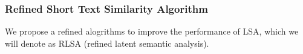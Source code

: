 



\subsubsection{Refined Short Text Similarity Algorithm}
We propose a refined alogrithms to improve the performance of LSA, 
which we will denote as RLSA (refined latent semantic analysis).

